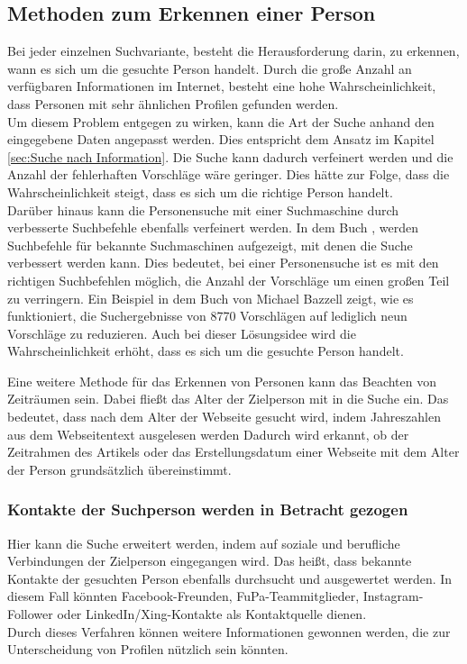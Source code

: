 \subsection{Methoden zum Erkennen einer Person}
\label{sec:WannhandeltessichumdiegesuchtePerson}
Bei jeder einzelnen Suchvariante, besteht die Herausforderung darin, zu erkennen, wann es sich um die gesuchte Person handelt. Durch die große Anzahl an verfügbaren Informationen im Internet, besteht eine hohe Wahrscheinlichkeit, dass Personen mit sehr ähnlichen Profilen gefunden werden.\\
Um diesem Problem entgegen zu wirken, kann die Art der Suche anhand den eingegebene Daten angepasst werden. Dies entspricht dem Ansatz im Kapitel \ref{sec:Suche nach Information}. Die Suche kann dadurch verfeinert werden und die Anzahl der fehlerhaften Vorschläge wäre geringer. Dies hätte zur Folge, dass die Wahrscheinlichkeit steigt, dass es sich um die richtige Person handelt.\\
Darüber hinaus kann die Personensuche mit einer Suchmaschine durch verbesserte Suchbefehle ebenfalls verfeinert werden. In dem Buch \cite{Bazzell}, werden Suchbefehle für bekannte Suchmaschinen aufgezeigt, mit denen die Suche verbessert werden kann. Dies bedeutet, bei einer Personensuche ist es mit den richtigen Suchbefehlen möglich, die Anzahl der Vorschläge um einen großen Teil zu verringern. Ein Beispiel in dem Buch von Michael Bazzell zeigt, wie es funktioniert, die Suchergebnisse von 8770 Vorschlägen auf lediglich neun Vorschläge zu reduzieren.\cite{Bazzell} 
Auch bei dieser Lösungsidee wird die Wahrscheinlichkeit erhöht, dass es sich um die gesuchte Person handelt.

Eine weitere Methode für das Erkennen von Personen kann das Beachten von Zeiträumen sein. Dabei fließt das Alter der Zielperson mit in die Suche ein. Das bedeutet, dass nach dem Alter der Webseite gesucht wird, indem Jahreszahlen aus dem Webseitentext ausgelesen werden Dadurch wird erkannt, ob der Zeitrahmen des Artikels oder das Erstellungsdatum einer Webseite mit dem Alter der Person grundsätzlich übereinstimmt.

\subsubsection{Kontakte der Suchperson werden in Betracht gezogen}	
Hier kann die Suche erweitert werden, indem auf soziale und berufliche Verbindungen der Zielperson eingegangen wird. Das heißt, dass bekannte Kontakte der gesuchten Person ebenfalls durchsucht und ausgewertet werden. In diesem Fall könnten Facebook-Freunden, FuPa-Teammitglieder, Instagram-Follower oder LinkedIn/Xing-Kontakte als Kontaktquelle dienen.\\
Durch dieses Verfahren können weitere Informationen gewonnen werden, die zur Unterscheidung von Profilen nützlich sein könnten.
